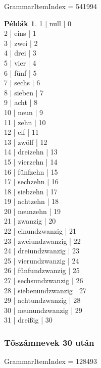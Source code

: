 \documentclass{article}
\theoremstyle{definition}
\newtheorem*{exmp}{Példák}
\begin{document}
GrammarItemIndex = 541994

\begin{exmp}
1 | null | 0\\
2 | eins | 1\\
3 | zwei | 2\\
4 | drei | 3\\
5 | vier | 4\\
6 | fünf | 5\\
7 | sechs | 6\\
8 | sieben | 7\\
9 | acht | 8\\
10 | neun | 9\\
11 | zehn | 10\\
12 | elf | 11\\
13 | zwölf | 12\\
14 | dreizehn | 13\\
15 | vierzehn | 14\\
16 | fünfzehn | 15\\
17 | sechzehn | 16\\
18 | siebzehn | 17\\
19 | achtzehn | 18\\
20 | neunzehn | 19\\
21 | zwanzig | 20\\
22 | einundzwanzig | 21\\
23 | zweiundzwanzig | 22\\
24 | dreiundzwanzig | 23\\
25 | vierundzwanzig | 24\\
26 | fünfundzwanzig | 25\\
27 | sechsundzwanzig | 26\\
28 | siebenundzwanzig | 27\\
29 | achtundzwanzig | 28\\
30 | neunundzwanzig | 29\\
31 | dreißig | 30\\
\end{exmp}

\subsubsection{Tőszámnevek 30 után}

GrammarItemIndex = 128493
\end{document}

